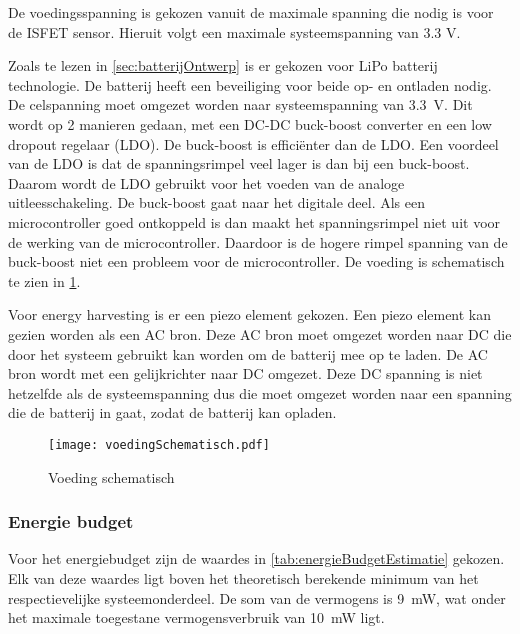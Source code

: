 
De voedingsspanning is gekozen vanuit de maximale spanning die nodig is voor de ISFET sensor\cite{isfet}. Hieruit volgt een maximale systeemspanning van 3.3 V.


Zoals te lezen in \cref{sec:batterijOntwerp} is er gekozen voor LiPo batterij technologie. De batterij heeft een beveiliging voor beide op- en ontladen nodig. De celspanning moet omgezet worden naar systeemspanning van \qty{3.3}{\volt}. Dit wordt op 2 manieren gedaan, met een DC-DC buck-boost converter en een low dropout regelaar (LDO). De buck-boost is efficiënter dan de LDO. Een voordeel van de LDO is dat de spanningsrimpel veel lager is dan bij een buck-boost. Daarom wordt de LDO gebruikt voor het voeden van de analoge uitleesschakeling. De buck-boost gaat naar het digitale deel. Als een microcontroller goed ontkoppeld is dan maakt het spanningsrimpel niet uit voor de werking van de microcontroller. Daardoor is de hogere rimpel spanning van de buck-boost niet een probleem voor de microcontroller. De voeding is schematisch te zien in \cref{fig:voedingSchematisch}.

Voor energy harvesting is er een piezo element gekozen. Een piezo element kan gezien worden als een AC bron. Deze AC bron moet omgezet worden naar DC die door het systeem gebruikt kan worden om de batterij mee op te laden. De AC bron wordt met een gelijkrichter naar DC omgezet. Deze DC spanning is niet hetzelfde als de systeemspanning dus die moet omgezet worden naar een spanning die de batterij in gaat, zodat de batterij kan opladen.

\begin{figure}[!htbp]
    \centering
    \texttt{[image: voedingSchematisch.pdf]}
    \caption{Voeding schematisch}
    \label{fig:voedingSchematisch}
\end{figure}



\subsubsection{Energie budget}\label{sec:energyBudgets}
Voor het energiebudget zijn de waardes in \cref{tab:energieBudgetEstimatie} gekozen. Elk van deze waardes ligt boven het theoretisch berekende minimum van het respectievelijke systeemonderdeel. De som van de vermogens is \qty{9}{\milli\watt}, wat onder het maximale toegestane vermogensverbruik van \qty{10}{\milli\watt} ligt.


